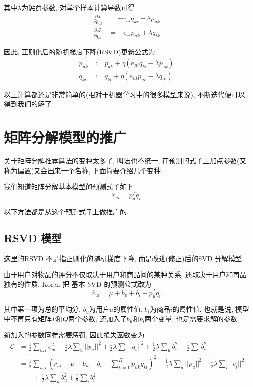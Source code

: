 \documentclass[a4paper,UTF8]{ctexart}
\theoremstyle{plain} \newtheorem{theorem}{定理}[section]
\theoremstyle{plain} \newtheorem{definition}{定义}[section]
\theoremstyle{plain} \newtheorem{lemma}{引理}[section]
\theoremstyle{plain} \newtheorem{proposition}{命题}[section]
\theoremstyle{plain} \newtheorem{example}{例}[section]
\theoremstyle{plain} \newtheorem{remark}{注}[section]
\theoremstyle{plain} \newtheorem{corollary}{推论}[section]
\newcommand{\p}[3]{\frac{\partial^{#1}#2}{\partial{#3}^{#1}}}  %
\begin{document}
其中$\lambda$为惩罚参数, 对单个样本计算导数可得
\begin{align*}
\p{}{\mathcal{L}}{p_{uk}} & = - e_{ui} q_{ki} + \lambda p_{uk} \\ 
\p{}{\mathcal{L}}{q_{ik}} & = - e_{ui} p_{uk} + \lambda q_{ik}
\end{align*}

因此, 正则化后的随机梯度下降(RSVD)更新公式为
\begin{align*}
p_{uk} & := p_{uk} + \eta (e_{ui} q_{ki} - \lambda p_{uk}) \\ 
q_{ki} & := q_{ki} + \eta (e_{ui} p_{uk} - \lambda q_{ik})
\end{align*}

以上计算都还是非常简单的(相对于机器学习中的很多模型来说), 不断迭代便可以得到我们的解了.


\section{矩阵分解模型的推广}
关于矩阵分解推荐算法的变种太多了, 叫法也不统一, 在预测的式子上加点参数(又称为偏置)又会出来一个名称, 下面简要介绍几个变种.

我们知道矩阵分解基本模型的预测式子如下
\begin{equation*}
\hat{r}_{ui} = p_{u}^{T} q_{i}
\end{equation*}

以下方法都是从这个预测式子上做推广的.

\subsection{RSVD 模型}
这里的RSVD 不是指正则化的随机梯度下降, 而是改进(修正)后的SVD 分解模型.

由于用户对物品的评分不仅取决于用户和商品间的某种关系, 还取决于用户和商品独有的性质, Koren 把 基本 SVD 的预测公式改为
\begin{equation*}
\hat{r}_{ui} = \mu + b_{u} + b_{i} + p_{u}^{T} q_{i}
\end{equation*}

其中第一项为总的平均分, $b_{u}$为用户$u$的属性值, $b_{i}$为商品$i$的属性值. 也就是说, 模型中不再只有矩阵$P$和$Q$两个参数, 还加入了$b_{u}$和$b_{i}$两个变量, 也是需要求解的参数.

新加入的参数同样需要惩罚, 因此损失函数变为
\begin{align*}
\mathcal{L} & = \frac{1}{2} \sum_{u,i} e_{ui}^2 + \frac{1}{2} \lambda \sum_{u} ||p_u||^2 + \frac{1}{2} \lambda \sum_{i} ||q_i||^2 + \frac{1}{2} \lambda \sum_{u} b_{u}^2 + \frac{1}{2} \sum_{i} b_{i}^2 \\ 
& = \frac{1}{2} \sum_{u,i} \left(r_{ui} - \mu - b_{u} - b_{i} - \sum_{k=1}^{K} p_{uk} q_{ki} \right)^2 + \frac{1}{2} \lambda \sum_{u} ||p_u||^2 + \frac{1}{2} \lambda \sum_{i} ||q_i||^2 \\ 
& \qquad + \frac{1}{2} \lambda \sum_{u} b_{u}^2 + \frac{1}{2} \sum_{i} b_{i}^2 
\end{align*}
\end{document}
